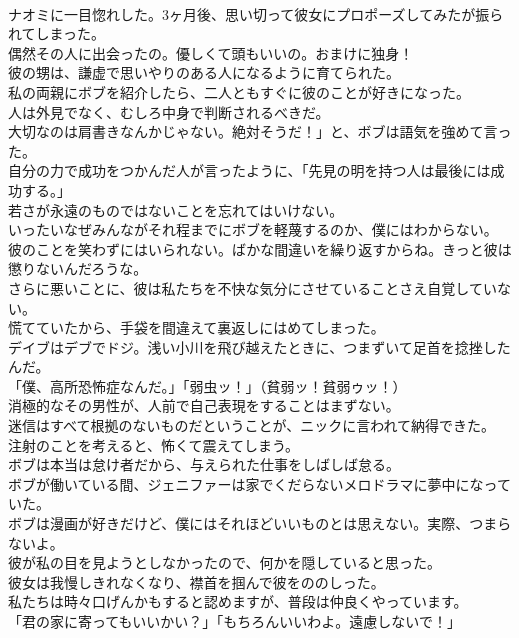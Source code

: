 \documentclass[8pt]{extreport}
\begin{document}
\begin{CJK}{UTF8}{min}
\\	ナオミに一目惚れした。3ヶ月後、思い切って彼女にプロポーズしてみたが振られてしまった。
\\	偶然その人に出会ったの。優しくて頭もいいの。おまけに独身！
\\	彼の甥は、謙虚で思いやりのある人になるように育てられた。
\\	私の両親にボブを紹介したら、二人ともすぐに彼のことが好きになった。
\\	人は外見でなく、むしろ中身で判断されるべきだ。
\\	大切なのは肩書きなんかじゃない。絶対そうだ！」と、ボブは語気を強めて言った。
\\	自分の力で成功をつかんだ人が言ったように、「先見の明を持つ人は最後には成功する。」
\\	若さが永遠のものではないことを忘れてはいけない。
\\	いったいなぜみんながそれ程までにボブを軽蔑するのか、僕にはわからない。
\\	彼のことを笑わずにはいられない。ばかな間違いを繰り返すからね。きっと彼は懲りないんだろうな。
\\	さらに悪いことに、彼は私たちを不快な気分にさせていることさえ自覚していない。
\\	慌てていたから、手袋を間違えて裏返しにはめてしまった。
\\	デイブはデブでドジ。浅い小川を飛び越えたときに、つまずいて足首を捻挫したんだ。
\\	「僕、高所恐怖症なんだ。」「弱虫ッ！」（貧弱ッ！貧弱ゥッ！）
\\	消極的なその男性が、人前で自己表現をすることはまずない。
\\	迷信はすべて根拠のないものだということが、ニックに言われて納得できた。
\\	注射のことを考えると、怖くて震えてしまう。
\\	ボブは本当は怠け者だから、与えられた仕事をしばしば怠る。
\\	ボブが働いている間、ジェニファーは家でくだらないメロドラマに夢中になっていた。
\\	ボブは漫画が好きだけど、僕にはそれほどいいものとは思えない。実際、つまらないよ。
\\	彼が私の目を見ようとしなかったので、何かを隠していると思った。
\\	彼女は我慢しきれなくなり、襟首を掴んで彼をののしった。
\\	私たちは時々口げんかもすると認めますが、普段は仲良くやっています。
\\	「君の家に寄ってもいいかい？」「もちろんいいわよ。遠慮しないで！」

\end{CJK}
\end{document}
